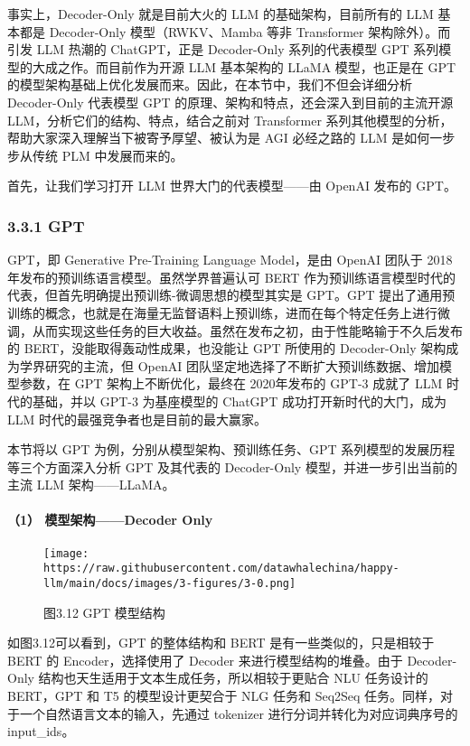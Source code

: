 \documentclass[12pt,a4paper]{book}
\begin{document}
事实上，Decoder-Only 就是目前大火的 LLM 的基础架构，目前所有的 LLM
基本都是 Decoder-Only 模型（RWKV、Mamba 等非 Transformer
架构除外）。而引发 LLM 热潮的 ChatGPT，正是 Decoder-Only 系列的代表模型
GPT 系列模型的大成之作。而目前作为开源 LLM 基本架构的 LLaMA
模型，也正是在 GPT
的模型架构基础上优化发展而来。因此，在本节中，我们不但会详细分析
Decoder-Only 代表模型 GPT 的原理、架构和特点，还会深入到目前的主流开源
LLM，分析它们的结构、特点，结合之前对 Transformer
系列其他模型的分析，帮助大家深入理解当下被寄予厚望、被认为是 AGI
必经之路的 LLM 是如何一步步从传统 PLM 中发展而来的。

首先，让我们学习打开 LLM 世界大门的代表模型------由 OpenAI 发布的 GPT。

\subsubsection{3.3.1 GPT}\label{gpt}

GPT，即 Generative Pre-Training Language Model，是由 OpenAI 团队于
2018年发布的预训练语言模型。虽然学界普遍认可 BERT
作为预训练语言模型时代的代表，但首先明确提出预训练-微调思想的模型其实是
GPT。GPT
提出了通用预训练的概念，也就是在海量无监督语料上预训练，进而在每个特定任务上进行微调，从而实现这些任务的巨大收益。虽然在发布之初，由于性能略输于不久后发布的
BERT，没能取得轰动性成果，也没能让 GPT 所使用的 Decoder-Only
架构成为学界研究的主流，但 OpenAI
团队坚定地选择了不断扩大预训练数据、增加模型参数，在 GPT
架构上不断优化，最终在 2020年发布的 GPT-3 成就了 LLM 时代的基础，并以
GPT-3 为基座模型的 ChatGPT 成功打开新时代的大门，成为 LLM
时代的最强竞争者也是目前的最大赢家。

本节将以 GPT 为例，分别从模型架构、预训练任务、GPT
系列模型的发展历程等三个方面深入分析 GPT 及其代表的 Decoder-Only
模型，并进一步引出当前的主流 LLM 架构------LLaMA。

\paragraph{（1） 模型架构------Decoder
Only}\label{ux6a21ux578bux67b6ux6784decoder-only}

\begin{figure}[htbp]\centering
\texttt{[image: https://raw.githubusercontent.com/datawhalechina/happy-llm/main/docs/images/3-figures/3-0.png]}
\caption{图3.12 GPT 模型结构}
\end{figure}

如图3.12可以看到，GPT 的整体结构和 BERT 是有一些类似的，只是相较于 BERT
的 Encoder，选择使用了 Decoder 来进行模型结构的堆叠。由于 Decoder-Only
结构也天生适用于文本生成任务，所以相较于更贴合 NLU 任务设计的 BERT，GPT
和 T5 的模型设计更契合于 NLG 任务和 Seq2Seq
任务。同样，对于一个自然语言文本的输入，先通过 tokenizer
进行分词并转化为对应词典序号的 input\_ids。
\end{document}
